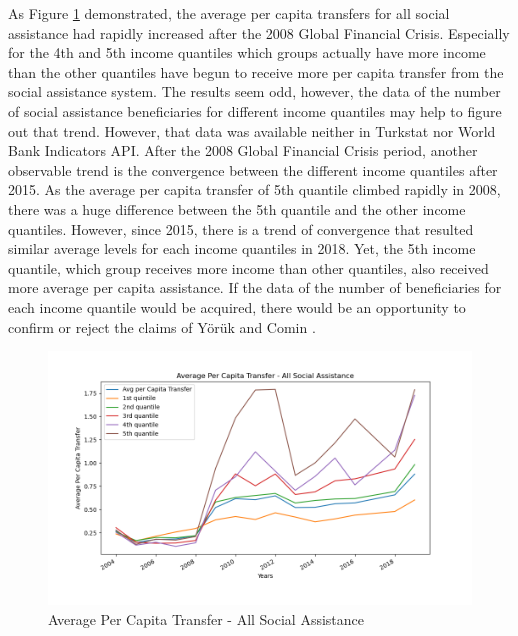 \documentclass[11pt]{article}
\begin{document}
\noindent As Figure \ref{fig:avgtr} demonstrated, the average per capita transfers for all social assistance had rapidly increased after the 2008 Global Financial Crisis. Especially for the 4th and 5th income quantiles which groups actually have more income than the other quantiles have begun to receive more per capita transfer from the social assistance system. The results seem odd, however, the data of the number of social assistance beneficiaries for different income quantiles may help to figure out that trend. However, that data was available neither in Turkstat nor World Bank Indicators API. After the 2008 Global Financial Crisis period, another observable trend is the convergence between the different income quantiles after 2015. As the average per capita transfer of 5th quantile climbed rapidly in 2008, there was a huge difference between the 5th quantile and the other income quantiles. However, since 2015, there is a trend of convergence that resulted similar average levels for each income quantiles in 2018. Yet, the 5th income quantile, which group receives more income than other quantiles, also received more average per capita assistance. If the data of the number of beneficiaries for each income quantile would be acquired, there would be an opportunity to confirm or reject the claims of Yörük and Comin \cite{yoruk2020electoral}. \\

\begin{figure}[htbp]
    \begin{center}
    \includegraphics[width=6in]{avgpercaptransfer.png}
    \caption{Average Per Capita Transfer - All Social Assistance}
    \label{fig:avgtr}
    \end{center}
\end{figure}
\end{document}
